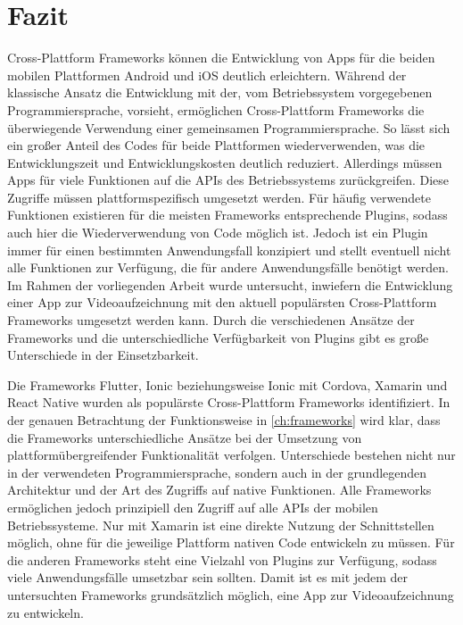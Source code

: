 \chapter{Fazit}
\label{ch:fazit}


Cross-Plattform Frameworks können die Entwicklung von Apps für die beiden mobilen Plattformen Android und iOS deutlich erleichtern.
Während der klassische Ansatz die Entwicklung mit der, vom Betriebssystem vorgegebenen Programmiersprache, vorsieht, ermöglichen Cross-Plattform Frameworks die überwiegende Verwendung einer gemeinsamen Programmiersprache.
So lässt sich ein großer Anteil des Codes für beide Plattformen wiederverwenden, was die Entwicklungszeit und Entwicklungskosten deutlich reduziert.
Allerdings müssen Apps für viele Funktionen auf die \acp{API} des Betriebssystems zurückgreifen.
Diese Zugriffe müssen plattformspezifisch umgesetzt werden.
Für häufig verwendete Funktionen existieren für die meisten Frameworks entsprechende Plugins, sodass auch hier die Wiederverwendung von Code möglich ist.
Jedoch ist ein Plugin immer für einen bestimmten Anwendungsfall konzipiert und stellt eventuell nicht alle Funktionen zur Verfügung, die für andere Anwendungsfälle benötigt werden.
Im Rahmen der vorliegenden Arbeit wurde untersucht, inwiefern die Entwicklung einer App zur Videoaufzeichnung mit den aktuell populärsten Cross-Plattform Frameworks umgesetzt werden kann.
Durch die verschiedenen Ansätze der Frameworks und die unterschiedliche Verfügbarkeit von Plugins gibt es große Unterschiede in der Einsetzbarkeit.


Die Frameworks Flutter, Ionic beziehungsweise Ionic mit Cordova, Xamarin und React Native wurden als populärste Cross-Plattform Frameworks identifiziert.
In der genauen Betrachtung der Funktionsweise in \autoref{ch:frameworks} wird klar, dass die Frameworks unterschiedliche Ansätze bei der Umsetzung von plattformübergreifender Funktionalität verfolgen.
Unterschiede bestehen nicht nur in der verwendeten Programmiersprache, sondern auch in der grundlegenden Architektur und der Art des Zugriffs auf native Funktionen.
Alle Frameworks ermöglichen jedoch prinzipiell den Zugriff auf alle \acp{API} der mobilen Betriebssysteme.
Nur mit Xamarin ist eine direkte Nutzung der Schnittstellen möglich, ohne für die jeweilige Plattform nativen Code entwickeln zu müssen.
Für die anderen Frameworks steht eine Vielzahl von Plugins zur Verfügung, sodass viele Anwendungsfälle umsetzbar sein sollten.
Damit ist es mit jedem der untersuchten Frameworks grundsätzlich möglich, eine App zur Videoaufzeichnung zu entwickeln.


